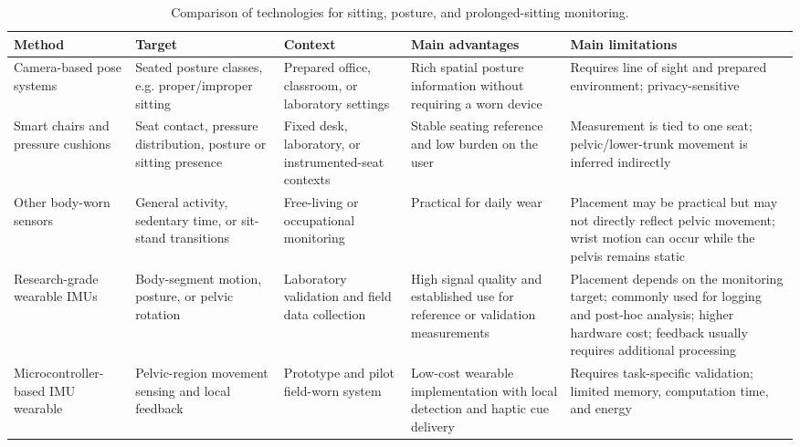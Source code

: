 \begin{table}[t]
    \centering
    \scriptsize
    \caption{Comparison of technologies for sitting, posture, and prolonged-sitting monitoring.}
    \label{tab:intro_monitoring_tech_comparison}
    \begin{tabular}{@{}>{\raggedright\arraybackslash}p{}
                    >{\raggedright\arraybackslash}p{}
                    >{\raggedright\arraybackslash}p{}
                    >{\raggedright\arraybackslash}p{}
                    >{\raggedright\arraybackslash}p{}@{}}
        \toprule
        Method & Target & Context & Main advantages & Main limitations \\
        \midrule
        Camera-based pose systems & Seated posture classes, e.g. proper/improper sitting & Prepared office, classroom, or laboratory settings & Rich spatial posture information without requiring a worn device & Requires line of sight and prepared environment; privacy-sensitive~\citep{lan2023vision,estrada2023machine,hansen2019fusing} \\
        Smart chairs and pressure cushions & Seat contact, pressure distribution, posture or sitting presence & Fixed desk, laboratory, or instrumented-seat contexts & Stable seating reference and low burden on the user & Measurement is tied to one seat; pelvic/lower-trunk movement is inferred indirectly~\citep{tan2001sensing,ma2017activity,kappattanavar2021monitoring} \\
        Other body-worn sensors & General activity, sedentary time, or sit-stand transitions & Free-living or occupational monitoring & Practical for daily wear & Placement may be practical but may not directly reflect pelvic movement; wrist motion can occur while the pelvis remains static \\
        Research-grade wearable IMUs & Body-segment motion, posture, or pelvic rotation & Laboratory validation and field data collection & High signal quality and established use for reference or validation measurements & Placement depends on the monitoring target; commonly used for logging and post-hoc analysis; higher hardware cost; feedback usually requires additional processing~\citep{papi2017wearable,liao2026imu_pelvic_rotation,shimmer_consensys_imu_devkit} \\
        Microcontroller-based IMU wearable & Pelvic-region movement sensing and local feedback & Prototype and pilot field-worn system & Low-cost wearable implementation with local detection and haptic cue delivery & Requires task-specific validation; limited memory, computation time, and energy~\citep{seeed_xiao_nrf54l15_sense,stmicroelectronics_lsm6ds3trc} \\
        \bottomrule
    \end{tabular}
\end{table}

